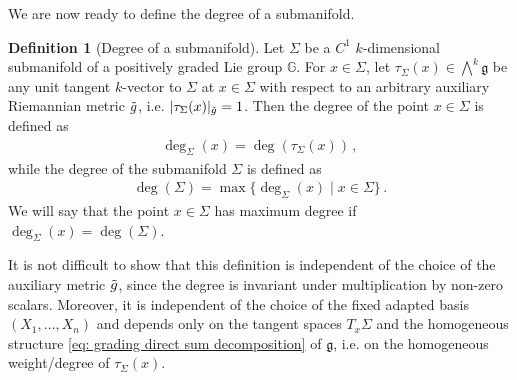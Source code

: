 \documentclass[dvipsnames]{amsart}
\theoremstyle{definition}
\newtheorem{definition}[theorem]{Definition}
\theoremstyle{definition}
\numberwithin{equation}{section}
\newcommand{\G}{\mathbb{G}}
\begin{document}
We are now ready to define the degree of a submanifold.
\begin{definition}[Degree of a submanifold]\label{def: weight of manifold}
    Let $\Sigma$ be a $C^1$ $k$-dimensional submanifold of a positively graded Lie group $\G$. For $x\in\Sigma$, let $\tau_\Sigma(x)\in\bigwedge^k\mathfrak{g}$ be any unit tangent $k$-vector to $\Sigma$ at $x\in\Sigma$ with respect to an arbitrary auxiliary Riemannian metric $\Tilde{g}$, i.e. $\vert\tau_\Sigma(x)\vert_{\Tilde{g}}=1$. Then the degree of the point $x\in\Sigma$ is defined as
    \begin{align*}
        \operatorname{deg}_\Sigma(x)=\operatorname{deg}(\tau_\Sigma(x))\,,
    \end{align*}
    while the degree of the submanifold $\Sigma$ is defined as
    \begin{align*}
        \operatorname{deg}(\Sigma)=\max\{\operatorname{deg}_\Sigma(x)\mid x\in\Sigma\}\,.
    \end{align*}
    We will say that the point $x\in\Sigma$ has maximum degree if $\operatorname{deg}_\Sigma(x)=\operatorname{deg}(\Sigma)$.
\end{definition}
It is not difficult to show that this definition is independent of the choice of the auxiliary metric $\Tilde{g}$, since the degree is invariant under multiplication by non-zero scalars. Moreover, it is independent of the choice of the fixed adapted basis $(X_1,\ldots,X_n)$ and depends only on the tangent spaces $T_x\Sigma$ and the homogeneous structure \eqref{eq: grading direct sum decomposition} of $\mathfrak{g}$, i.e. on the homogeneous weight/degree of $\tau_\Sigma(x)$.
\end{document}
